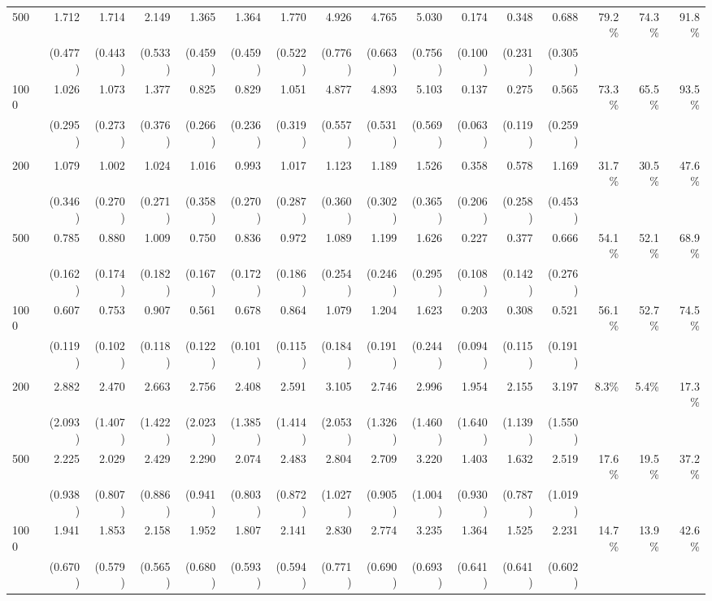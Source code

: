 \begin{table}[H]
{\begin{tabular}{lrrrrrrrrrrrrrrr}
500 & 1.712 & 1.714 & 2.149 & 1.365 & 1.364 & 1.770 & 4.926 & 4.765 & 5.030 & 0.174 & 0.348 & 0.688 & 79.2\% & 74.3\% & 91.8\% \\
  & (0.477) & (0.443) & (0.533) & (0.459) & (0.459) & (0.522) & (0.776) & (0.663) & (0.756) & (0.100) & (0.231) & (0.305) &  &  &  \\
1000 & 1.026 & 1.073 & 1.377 & 0.825 & 0.829 & 1.051 & 4.877 & 4.893 & 5.103 & 0.137 & 0.275 & 0.565 & 73.3\% & 65.5\% & 93.5\% \\
  & (0.295) & (0.273) & (0.376) & (0.266) & (0.236) & (0.319) & (0.557) & (0.531) & (0.569) & (0.063) & (0.119) & (0.259) &  &  &  \\
\addlinespace
\midrule
\multicolumn{16}{l}{Interaction} \\
\midrule
200 & 1.079 & 1.002 & 1.024 & 1.016 & 0.993 & 1.017 & 1.123 & 1.189 & 1.526 & 0.358 & 0.578 & 1.169 & 31.7\% & 30.5\% & 47.6\% \\
  & (0.346) & (0.270) & (0.271) & (0.358) & (0.270) & (0.287) & (0.360) & (0.302) & (0.365) & (0.206) & (0.258) & (0.453) &  &  &  \\
500 & 0.785 & 0.880 & 1.009 & 0.750 & 0.836 & 0.972 & 1.089 & 1.199 & 1.626 & 0.227 & 0.377 & 0.666 & 54.1\% & 52.1\% & 68.9\% \\
  & (0.162) & (0.174) & (0.182) & (0.167) & (0.172) & (0.186) & (0.254) & (0.246) & (0.295) & (0.108) & (0.142) & (0.276) &  &  &  \\
1000 & 0.607 & 0.753 & 0.907 & 0.561 & 0.678 & 0.864 & 1.079 & 1.204 & 1.623 & 0.203 & 0.308 & 0.521 & 56.1\% & 52.7\% & 74.5\% \\
  & (0.119) & (0.102) & (0.118) & (0.122) & (0.101) & (0.115) & (0.184) & (0.191) & (0.244) & (0.094) & (0.115) & (0.191) &  &  &  \\
\addlinespace
\midrule
\multicolumn{16}{l}{Non-linear interaction} \\
\midrule
200 & 2.882 & 2.470 & 2.663 & 2.756 & 2.408 & 2.591 & 3.105 & 2.746 & 2.996 & 1.954 & 2.155 & 3.197 & 8.3\% & 5.4\% & 17.3\% \\
  & (2.093) & (1.407) & (1.422) & (2.023) & (1.385) & (1.414) & (2.053) & (1.326) & (1.460) & (1.640) & (1.139) & (1.550) &  &  &  \\
500 & 2.225 & 2.029 & 2.429 & 2.290 & 2.074 & 2.483 & 2.804 & 2.709 & 3.220 & 1.403 & 1.632 & 2.519 & 17.6\% & 19.5\% & 37.2\% \\
  & (0.938) & (0.807) & (0.886) & (0.941) & (0.803) & (0.872) & (1.027) & (0.905) & (1.004) & (0.930) & (0.787) & (1.019) &  &  &  \\
1000 & 1.941 & 1.853 & 2.158 & 1.952 & 1.807 & 2.141 & 2.830 & 2.774 & 3.235 & 1.364 & 1.525 & 2.231 & 14.7\% & 13.9\% & 42.6\% \\
  & (0.670) & (0.579) & (0.565) & (0.680) & (0.593) & (0.594) & (0.771) & (0.690) & (0.693) & (0.641) & (0.641) & (0.602) &  &  &  \\
\bottomrule
\end{tabular}%
}
\label{tab_mse}
\end{table}
